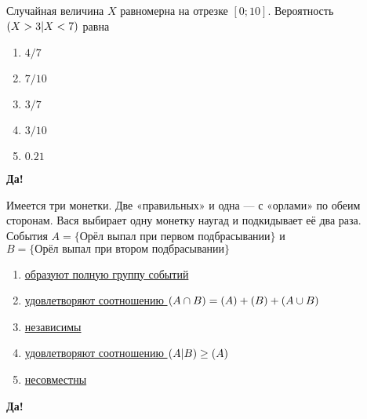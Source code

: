 \documentclass[t]{beamer}
\let\P\relax
\DeclareMathOperator{\P}{\mathbb{P}}
\begin{document}
 \begin{frame} \label{6-Yes} 
\begin{block}{6} 

Случайная величина $X$ равномерна на отрезке $[0;10]$. Вероятность $\P(X>3|X<7)$ равна
     


 \end{block} 
\begin{enumerate} 
\item[] \hyperlink{6-Yes}{\beamergotobutton{} $4/7$}
\item[] \hyperlink{6-No}{\beamergotobutton{} $7/10$}
\item[] \hyperlink{6-No}{\beamergotobutton{} $3/7$}
\item[] \hyperlink{6-No}{\beamergotobutton{} $3/10$}
\item[] \hyperlink{6-No}{\beamergotobutton{} $0.21$
}
\end{enumerate} 

 \textbf{Да!} 
 \hyperlink{7}{}\end{frame} 


 \begin{frame} \label{7-Yes} 
\begin{block}{7} 

Имеется три монетки. Две «правильных» и одна — с «орлами» по обеим сторонам. Вася выбирает одну монетку наугад и подкидывает её два раза. События $A = \{ \text{Орёл выпал при первом подбрасывании} \}$ и $B =\{\text{Орёл выпал при втором подбрасывании}\}$
   


 \end{block} 
\begin{enumerate} 
\item[] \hyperlink{7-No}{\beamergotobutton{} образуют полную группу событий}
\item[] \hyperlink{7-No}{\beamergotobutton{} удовлетворяют соотношению $\P(A\cap B)=\P(A)+\P(B) + \P(A\cup B)$
}
\item[] \hyperlink{7-No}{\beamergotobutton{} независимы}
\item[] \hyperlink{7-Yes}{\beamergotobutton{} удовлетворяют соотношению $\P(A|B)\geq \P(A)$}
\item[] \hyperlink{7-No}{\beamergotobutton{} несовместны}
\end{enumerate} 

 \textbf{Да!} 
 \hyperlink{8}{}\end{frame} 
\end{document}
